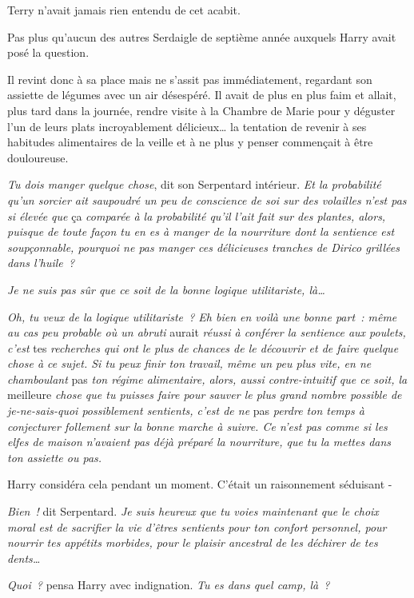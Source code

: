 \later

Terry n'avait jamais rien entendu de cet acabit.

Pas plus qu'aucun des autres Serdaigle de septième année auxquels Harry avait posé la question.

Il revint donc à sa place mais ne s'assit pas immédiatement, regardant son assiette de légumes avec un air désespéré. Il avait de plus en plus faim et allait, plus tard dans la journée, rendre visite à la Chambre de Marie pour y déguster l'un de leurs plats incroyablement délicieux… la tentation de revenir à ses habitudes alimentaires de la veille et à ne plus y penser commençait à être douloureuse.

\emph{Tu dois manger quelque chose}, dit son Serpentard intérieur. \emph{Et la probabilité qu'un sorcier ait saupoudré un peu de conscience de soi sur des volailles n'est pas si élevée que} ça \emph{comparée à la probabilité qu'il l'ait fait sur des plantes, alors, puisque de toute façon tu en es à manger de la nourriture dont la sentience est soupçonnable, pourquoi ne pas manger ces délicieuses tranches de Dirico grillées dans l'huile~?}

\emph{Je ne suis pas sûr que ce soit de la bonne logique utilitariste, là…}

\emph{Oh, tu veux de la logique utilitariste~? Eh bien en voilà une bonne part~: même au cas peu probable où un abruti} aurait \emph{réussi à conférer la sentience aux poulets, c'est} tes \emph{recherches qui ont le plus de chances de le découvrir et de faire quelque chose à ce sujet. Si tu peux finir ton travail, même un peu plus vite, en ne chamboulant} pas \emph{ton régime alimentaire, alors, aussi contre-intuitif que ce soit, la} meilleure \emph{chose que tu puisses faire pour sauver le plus grand nombre possible de je-ne-sais-quoi possiblement sentients, c'est de ne} pas \emph{perdre ton temps à conjecturer follement sur la bonne marche à suivre. Ce n'est pas comme si les elfes de maison n'avaient pas déjà préparé la nourriture, que tu la mettes dans ton assiette ou pas.}

Harry considéra cela pendant un moment. C'était un raisonnement séduisant -

\emph{Bien~!} dit Serpentard. \emph{Je suis heureux que tu voies maintenant que le choix moral est de sacrifier la vie d'êtres sentients pour ton confort personnel, pour nourrir tes appétits morbides, pour le plaisir ancestral de les déchirer de tes dents…}

\emph{Quoi~?} pensa Harry avec indignation. \emph{Tu es dans quel camp, là~?}

